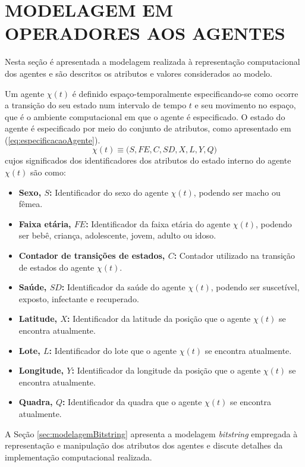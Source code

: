 \section{MODELAGEM EM OPERADORES AOS AGENTES}
\label{sec:modelagemAgentes}

Nesta seção é apresentada a modelagem realizada à representação computacional dos agentes e são descritos os atributos e valores considerados ao modelo.

Um agente $\chi(t)$ é definido espaço-temporalmente especificando-se como ocorre a transição do seu estado num intervalo de tempo $t$ e seu movimento no espaço, que é o ambiente computacional em que o agente é especificado. O estado do agente é especificado por meio do conjunto de atributos, como apresentado em (\ref{eq:especificacaoAgente}).
\begin{equation}
\label{eq:especificacaoAgente}
 \chi(t) \equiv \big(S, FE, C, SD, X, L, Y, Q \big)
\end{equation}
cujos significados dos identificadores dos atributos do estado interno do agente $\chi(t)$ são como:

\begin{itemize}
 \item \textbf{Sexo, $S$:} Identificador do sexo do agente $\chi(t)$, podendo ser macho ou fêmea.
 \item \textbf{Faixa etária, $FE$:} Identificador da faixa etária do agente $\chi(t)$, podendo ser bebê, criança, adolescente, jovem, adulto ou idoso.
 \item \textbf{Contador de transições de estados, $C$:} Contador utilizado na transição de estados do agente $\chi(t)$.
 \item \textbf{Saúde, $SD$:} Identificador da saúde do agente $\chi(t)$, podendo ser suscetível, exposto, infectante e recuperado.
 \item \textbf{Latitude, $X$:} Identificador da latitude da posição que o agente $\chi(t)$ se encontra atualmente.
 \item \textbf{Lote, $L$:} Identificador do lote que o agente $\chi(t)$ se encontra atualmente.
 \item \textbf{Longitude, $Y$:} Identificador da longitude da posição que o agente $\chi(t)$ se encontra atualmente.
 \item \textbf{Quadra, $Q$:} Identificador da quadra que o agente $\chi(t)$ se encontra atualmente.
\end{itemize}

A Seção \ref{sec:modelagemBitstring} apresenta a modelagem \textit{bitstring} empregada à representação e manipulação dos atributos dos agentes e discute detalhes da implementação computacional realizada.

\newpage
